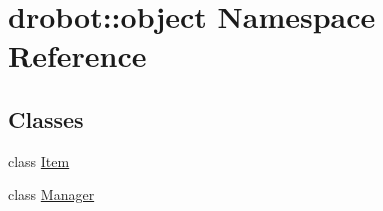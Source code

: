 \hypertarget{namespacedrobot_1_1object}{\section{drobot\-:\-:object Namespace Reference}
\label{namespacedrobot_1_1object}
}
\subsection*{Classes}
\begin{DoxyCompactItemize}
\item 
class \hyperlink{classdrobot_1_1object_1_1Item}{Item}
\item 
class \hyperlink{classdrobot_1_1object_1_1Manager}{Manager}
\end{DoxyCompactItemize}
